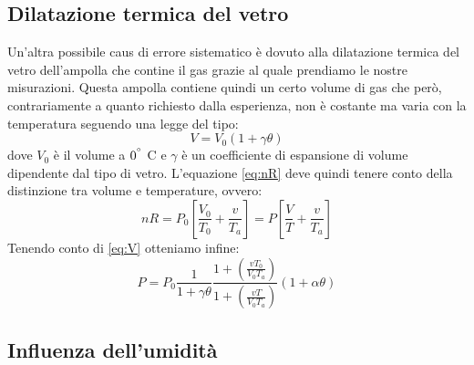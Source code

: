\subsection{Dilatazione termica del vetro}
Un'altra possibile caus di errore sistematico è dovuto alla dilatazione termica del vetro dell'ampolla che contine il gas grazie al quale prendiamo le nostre misurazioni.
Questa ampolla contiene quindi un certo volume di gas che però, contrariamente a quanto richiesto dalla  esperienza, non è costante ma varia con la temperatura seguendo una legge del tipo:
\begin{equation}
\label{eq:V}
V = V_0 (1 + \gamma \theta)
\end{equation}
dove $V_0$ è il volume a $0^{\degree}$ C e $\gamma$ è un coefficiente di espansione di volume dipendente dal tipo di vetro.
L'equazione \eqref{eq:nR} deve quindi tenere conto della distinzione tra volume e temperature, ovvero:
\begin{equation}
n R = P_0 \left[\frac{V_0}{T_0} + \frac{v}{T_a}\right] = P \left[\frac{V}{T} + \frac{v}{T_a}\right]
\end{equation}
Tenendo conto di \eqref{eq:V} otteniamo infine:
\begin{equation}
P = P_0 \frac{1}{1 + \gamma \theta} \frac{1 + \left(\frac{v T_0}{V_0 T_a} \right)}{1 + \left(\frac{v T}{V_0 T_a} \right)}(1 + \alpha \theta)
\end{equation}

\subsection{Influenza dell'umidità}
